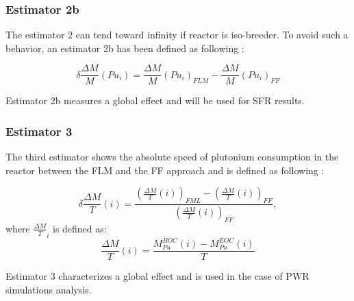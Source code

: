 \subsubsection{Estimator 2b}

The estimator 2 can tend toward infinity if reactor is iso-breeder. To avoid
such a behavior, an estimator 2b has been defined as following : 

\begin{equation}
    \delta \frac{\Delta M}{M}(Pu_i) = \frac{\Delta M}{M}(Pu_i)_{FLM} - \frac{\Delta M}{M}(Pu_i)_{FF}
\end{equation}

Estimator 2b measures a global effect and will be used for \gls{SFR} results.

\subsubsection{Estimator 3}

The third estimator shows the absolute speed of plutonium consumption in the
reactor between the \gls{FLM} and the \gls{FF} approach and is defined as
following :

\begin{equation}
    \delta{\frac{\Delta M}{T}}(i) =
        \frac{\left(\frac{\Delta M}{T}(i)\right)_{FML}
              - \left(\frac{\Delta M}{T}(i)\right)_{FF}}
             {\left(\frac{\Delta M}{T}(i)\right)_{FF}},
\end{equation}
where $\frac{\Delta M}{T}_{i}$ is defined as:
\begin{equation}
    \frac{\Delta M}{T}(i) = \frac{M_{Pu}^{BOC}(i) -
    M_{Pu}^{EOC}(i)}{T}
\end{equation}

Estimator 3 characterizes a global effect and is used in the case of \gls{PWR}
simulations analysis.

